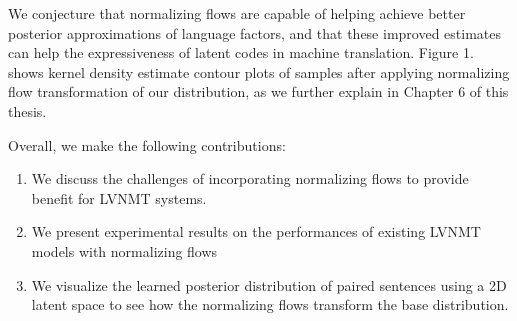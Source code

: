 We conjecture that normalizing flows are capable of helping achieve better posterior approximations of language factors, and that these improved estimates can help the expressiveness of latent codes in machine translation. Figure 1. shows kernel density estimate contour plots of samples after applying normalizing flow transformation
of our distribution, as we further explain in Chapter 6 of this thesis.



Overall, we make the following contributions:
\begin{enumerate}
	\item We discuss the challenges of incorporating normalizing flows to provide benefit for LVNMT systems. 
	
	\item We present experimental results on the performances of existing \ac{LVNMT} models with normalizing flows
	
	\item We visualize the learned posterior distribution of paired sentences using a 2D latent space to see how the normalizing flows transform the base distribution.
\end{enumerate}

